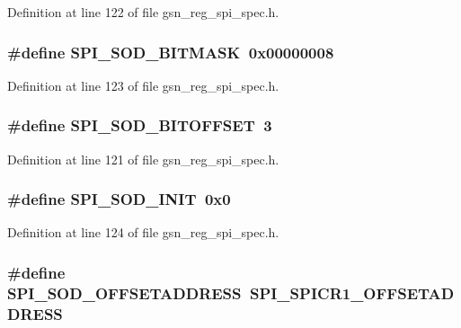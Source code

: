Definition at line 122 of file gsn\_\-reg\_\-spi\_\-spec.h.

\hypertarget{a00573_a5763ac2483593d523010c18a2a795b10}{
\subsubsection[{SPI\_\-SOD\_\-BITMASK}]{\setlength{\rightskip}{0pt plus 5cm}\#define SPI\_\-SOD\_\-BITMASK~0x00000008}}
\label{a00573_a5763ac2483593d523010c18a2a795b10}


Definition at line 123 of file gsn\_\-reg\_\-spi\_\-spec.h.

\hypertarget{a00573_a0e65fcf38c1b5c01e2fe4e55f38afe1e}{
\subsubsection[{SPI\_\-SOD\_\-BITOFFSET}]{\setlength{\rightskip}{0pt plus 5cm}\#define SPI\_\-SOD\_\-BITOFFSET~3}}
\label{a00573_a0e65fcf38c1b5c01e2fe4e55f38afe1e}


Definition at line 121 of file gsn\_\-reg\_\-spi\_\-spec.h.

\hypertarget{a00573_ae1877c1d12ba35a6eec07a335b270da2}{
\subsubsection[{SPI\_\-SOD\_\-INIT}]{\setlength{\rightskip}{0pt plus 5cm}\#define SPI\_\-SOD\_\-INIT~0x0}}
\label{a00573_ae1877c1d12ba35a6eec07a335b270da2}


Definition at line 124 of file gsn\_\-reg\_\-spi\_\-spec.h.

\hypertarget{a00573_a4eab66b23191611aff0e83e2fbe675fd}{
\subsubsection[{SPI\_\-SOD\_\-OFFSETADDRESS}]{\setlength{\rightskip}{0pt plus 5cm}\#define SPI\_\-SOD\_\-OFFSETADDRESS~SPI\_\-SPICR1\_\-OFFSETADDRESS}}
\label{a00573_a4eab66b23191611aff0e83e2fbe675fd}


